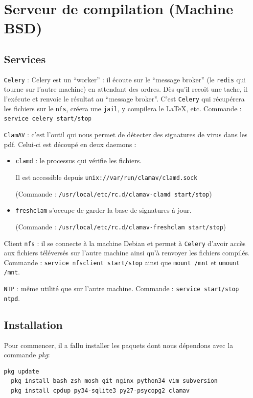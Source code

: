 \documentclass[10pt,a4paper]{article}
\begin{document}
\section{Serveur de compilation (Machine BSD)}
\subsection{Services}

\texttt{Celery} : Celery est un ``worker'' : il écoute sur le ``message broker'' (le \texttt{redis} qui tourne sur l'autre machine) en attendant des ordres.
Dès qu'il recoit une tache, il l'exécute et renvoie le résultat au ``message broker''.
C'est \texttt{Celery} qui récupérera les fichiers sur le \texttt{nfs}, créera une \texttt{jail}, y compilera le \LaTeX, etc.
Commande : \texttt{service celery start/stop}

\texttt{ClamAV} : c'est l'outil qui nous permet de détecter des signatures de virus dans les pdf.
Celui-ci est découpé en deux daemons :
        \begin{itemize}
            \item \texttt{clamd} : le processus qui vérifie les fichiers.

            Il est accessible depuis \texttt{unix://var/run/clamav/clamd.sock}

            (Commande : \texttt{/usr/local/etc/rc.d/clamav-clamd start/stop})
            \item \texttt{freshclam} s'occupe de garder la base de signatures à jour.

            (Commande : \texttt{/usr/local/etc/rc.d/clamav-freshclam start/stop})
        \end{itemize}

\vspace{1em} %
Client \texttt{nfs} : il se connecte à la machine Debian et permet à \texttt{Celery} d'avoir accès aux fichiers téléversés sur l'autre machine ainsi qu'à renvoyer les fichiers compilés.
Commande : \texttt{service nfsclient start/stop} ainsi que \texttt{mount /mnt} et \texttt{umount /mnt}.

\texttt{NTP} : même utilité que sur l'autre machine.
Commande : \texttt{service start/stop ntpd}.

\subsection{Installation}
Pour commencer, il a fallu installer les paquets dont nous dépendons avec la commande \emph{pkg}:
\begin{lstlisting}[language=bash]
  pkg update
  pkg install bash zsh mosh git nginx python34 vim subversion
  pkg install cpdup py34-sqlite3 py27-psycopg2 clamav
\end{lstlisting}
\end{document}
